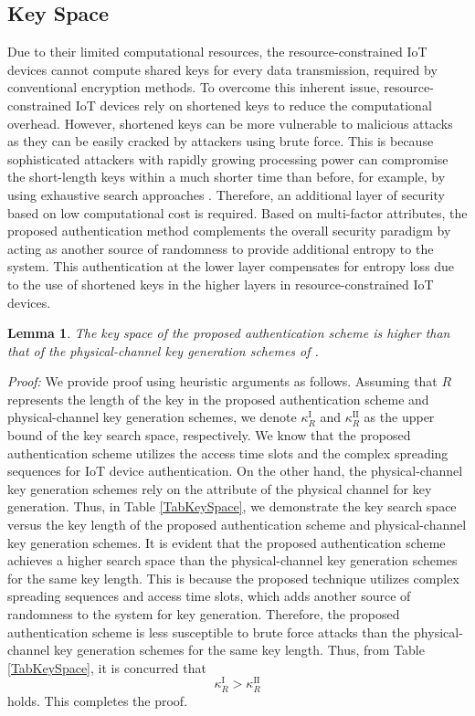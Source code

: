 \documentclass[journal,10pt]{IEEEtran}
\newtheorem{lemma}{Lemma}
\begin{document}
\subsection{Key Space}
Due to their limited computational resources, the resource-constrained IoT devices cannot compute shared keys for every data transmission, required by conventional encryption methods. To overcome this inherent issue, resource-constrained IoT devices rely on shortened keys to reduce the computational overhead. However, shortened keys can be more vulnerable to malicious attacks as they can be easily cracked by attackers using brute force. This is because sophisticated attackers with rapidly growing processing power can compromise the short-length keys within a much shorter time than before, for example, by using exhaustive search approaches \cite{zeng2015physical}. Therefore, an additional layer of security based on low computational cost is required. Based on multi-factor attributes, the proposed authentication method complements the overall security paradigm by acting as another source of randomness to provide additional entropy to the system. This authentication at the lower layer compensates for entropy loss due to the use of shortened keys in the higher layers in resource-constrained IoT devices. 


\begin{lemma}
\textit{The key space of the proposed authentication scheme is higher than that of the physical-channel key generation schemes of \cite{wang2015survey, wilhelm2013secure, edman2016security, zhang2016efficient}.}
\end{lemma}

\textit{Proof:} We provide proof using heuristic arguments as follows. Assuming that $R$ represents the length of the key in the proposed authentication scheme and physical-channel key generation schemes, we denote $\kappa_R^{\text{I}}$ and $\kappa_R^{\text{II}}$ as the upper bound of the key search space, respectively. We know that the proposed authentication scheme utilizes the access time slots and the complex spreading sequences for IoT device authentication. On the other hand, the physical-channel key generation schemes rely on the attribute of the physical channel for key generation. Thus, in Table \ref{TabKeySpace}, we demonstrate the key search space versus the key length of the proposed authentication scheme and physical-channel key generation schemes. It is evident that the proposed authentication scheme achieves a higher search space than the physical-channel key generation schemes for the same key length. This is because the proposed technique utilizes complex spreading sequences and access time slots, which adds another source of randomness to the system for key generation. Therefore, the proposed authentication scheme is less susceptible to brute force attacks than the physical-channel key generation schemes for the same key length. Thus, from Table \ref{TabKeySpace}, it is concurred that
\begin{equation} \label{entroII}
    \kappa_R^{\text{I}} > \kappa_R^{\text{II}}
\end{equation}
holds. This completes the proof. 
\end{document}
